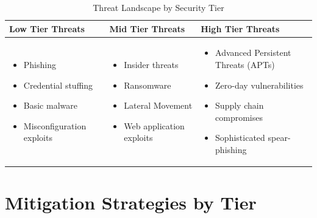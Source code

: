 \documentclass{article}
\begin{document}
\begin{table}[H]
\centering
\renewcommand{\arraystretch}{1.4}
\begin{tabular}{|p{4cm}|p{4cm}|p{4cm}|}
\hline
\textbf{Low Tier Threats} & \textbf{Mid Tier Threats} & \textbf{High Tier Threats} \\ \hline

\begin{itemize}
    \item Phishing
    \item Credential stuffing
    \item Basic malware
    \item Misconfiguration exploits
\end{itemize}
&
\begin{itemize}
    \item Insider threats
    \item Ransomware
    \item Lateral Movement
    \item Web application exploits
\end{itemize}
&
\begin{itemize}
    \item Advanced Persistent Threats (APTs)
    \item Zero-day vulnerabilities
    \item Supply chain compromises
    \item Sophisticated spear-phishing
\end{itemize}
\\ \hline
\end{tabular}
\caption{Threat Landscape by Security Tier}
\end{table}

\section{Mitigation Strategies by Tier}
\end{document}
